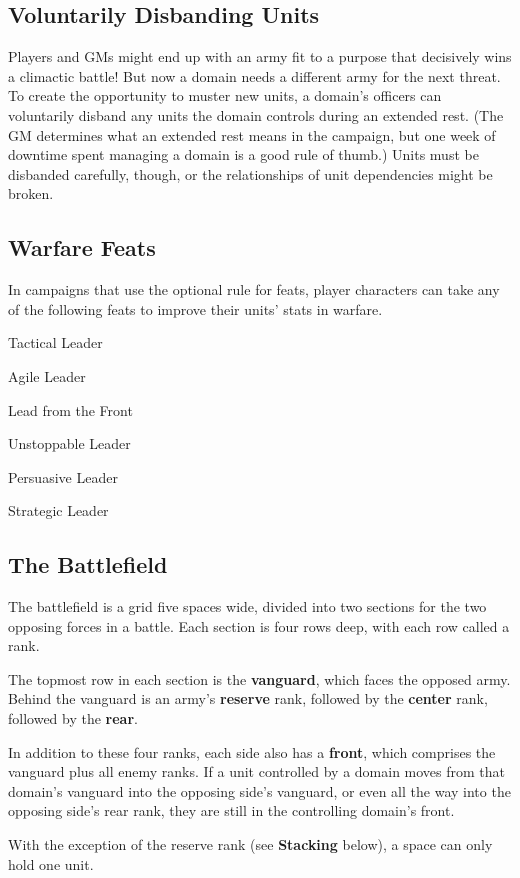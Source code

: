 \documentclass[10pt,a4paper,twoside,bg=print,twocolumn,openany,nodeprecatedcode]{dndbook}
\begin{document}
\subsection{Voluntarily Disbanding Units}
Players and GMs might end up with an army fit to a purpose that decisively wins a climactic battle! But now a domain needs a different army for the next threat. To create the opportunity to muster new units, a domain's officers can voluntarily disband any units the domain controls during an extended rest. (The GM determines what an extended rest means in the campaign, but one week of downtime spent managing a domain is a good rule of thumb.) Units must be disbanded carefully, though, or the relationships of unit dependencies might be broken.

\subsection{Warfare Feats}
In campaigns that use the optional rule for feats, player characters can take any of the following feats to improve their units' stats in warfare.

Tactical Leader

Agile Leader

Lead from the Front

Unstoppable Leader

Persuasive Leader

Strategic Leader

\subsection{The Battlefield}
The battlefield is a grid five spaces wide, divided into two sections for the two opposing forces in a battle. Each section is four rows deep, with each row called a rank.

The topmost row in each section is the \textbf{vanguard}, which faces the opposed army. Behind the vanguard is an army's \textbf{reserve} rank, followed by the \textbf{center} rank, followed by the \textbf{rear}.

In addition to these four ranks, each side also has a \textbf{front}, which comprises the vanguard plus all enemy ranks. If a unit controlled by a domain moves from that domain's vanguard into the opposing side's vanguard, or even all the way into the opposing side's rear rank, they are still in the controlling domain's front.

With the exception of the reserve rank (see \textbf{Stacking} below), a space can only hold one unit.
\end{document}
